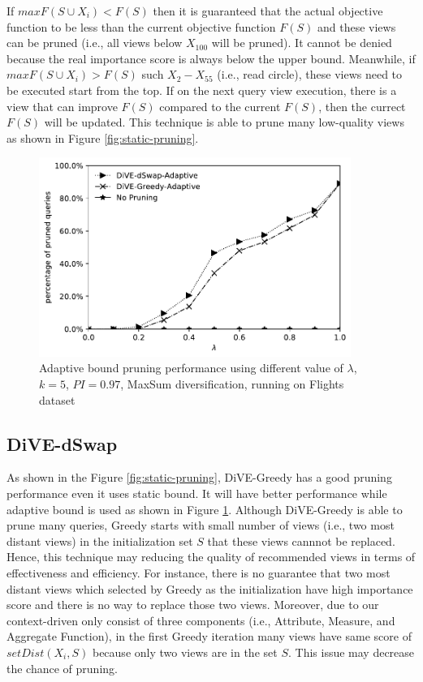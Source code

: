 \documentclass{article}
\begin{document}
If $ maxF(S \cup X_i) < F(S) $ then it is guaranteed that the actual objective function to be less than the current objective function $ F(S) $ and these views can be pruned (i.e., all views below $X_{100}$ will be pruned). It cannot be denied because the real importance score is always below the upper bound. Meanwhile, if $ maxF(S \cup X_i) > F(S) $ such $X_2 - X_{55}$ (i.e., read circle), these views need to be executed start from the top. If on the next query view execution, there is a view that can improve $ F(S) $ compared to the current $  F(S) $, then the currect $F(S)$ will be updated. This technique is able to prune many low-quality views as shown in Figure \ref{fig:static-pruning}.
\begin{figure}
	\begin{center}
		\includegraphics[width=4.0in]{figures/pruning_performance_greedy_dswap_adaptive}
		\vspace{-12pt}
		\caption{Adaptive bound pruning performance using different value of $ \lambda $, $k = 5$,  $ PI = 0.97 $, MaxSum diversification, running on Flights dataset}
		\label{fig:adaptive-pruning-performance}
		
	\end{center}
\end{figure}
\subsection{DiVE-dSwap}
As shown in the Figure \ref{fig:static-pruning}, DiVE-Greedy has a good pruning performance even it uses static bound. It will have better performance while adaptive bound is used as shown in Figure \ref{fig:adaptive-pruning-performance}. Although DiVE-Greedy is able to prune many queries, Greedy starts with small number of views (i.e., two most distant views) in the initialization set $S$ that these views cannnot be replaced. Hence, this technique may reducing the quality of recommended views in terms of effectiveness and efficiency. For instance, there is no guarantee that two most distant views which selected by Greedy as the initialization have high importance score and there is no way to replace those two views. Moreover, due to our context-driven only consist of three components (i.e., Attribute, Measure, and Aggregate Function), in the first Greedy iteration many views have same score of $ setDist(X_i, S) $ because only two views are in the set $S$. This issue may decrease the chance of pruning.
\end{document}
